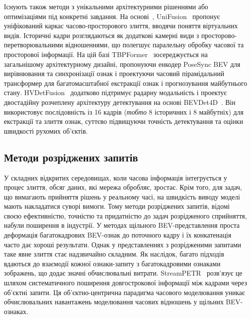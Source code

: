 Існують також методи з унікальними архітектурними рішеннями або оптимізаціями під конкретні завдання. На основі~\cite{li2022bevformer,yang2023bevformer,huang2021bevdet,huang2022bevdet4d}, UniFusion~\cite{qin2023unifusion} пропонує уніфікований каркас часово-просторового злиття, вводячи поняття віртуальних видів. Історичні кадри розглядаються як додаткові камерні види з просторово-перетворювальними відношеннями, що полегшує паралельну обробку часової та просторової інформації.
На цій базі TBPFormer~\cite{fang2023tbp} зосереджується на загальнішому архітектурному дизайні, пропонуючи енкодер PoseSync BEV для вирівнювання та синхронізації ознак і проектуючи часовий пірамідальний трансформер для багатомасштабної екстракції ознак і прогнозування майбутнього стану. HVDetFusion~\cite{lei2023hvdetfusion} додатково підтримує радарну модальність і проектує двостадійну розчеплену архітектуру детектування на основі BEVDet4D~\cite{huang2022bevdet4d}. Він використовує послідовність із 16 кадрів (\textit{тобто} 8 історичних і 8 майбутніх) для екстракції та злиття ознак, суттєво підвищуючи точність детектування та оцінки швидкості рухомих об'єктів.


\subsection{Методи розріджених запитів}

У складних відкритих середовищах, коли часова інформація інтегрується у процес злиття, обсяг даних, які мережа обробляє, зростає. Крім того, для задач, що вимагають прийняття рішень у реальному часі, на швидкість виводу моделі мають накладатися суворі вимоги. Тому методи розріджених запитів, відомі своєю ефективністю, точністю та придатністю до задач розрідженого сприйняття, набули поширення в індустрії.
У методах щільного BEV-представлення проста деформація багатокадрових BEV-ознак до поточного кадру і їх конкатенація часто дає хороші результати. Однак у представленнях з розрідженими запитами таке явне злиття стає надзвичайно складним. Як наслідок, багато підходів вдаються до взаємодії кожної ознаки-запиту з багатокадровими ознаками зображень, що додає значні обчислювальні витрати. StreamPETR~\cite{streampetr} розв'язує це шляхом систематичного поширення довгострокової інформації між кадрами через об'єктні запити. Ця об'єктно-центрична парадигма часового моделювання уникає обчислювальних навантажень моделювання часових відношень у щільних BEV-ознаках.

